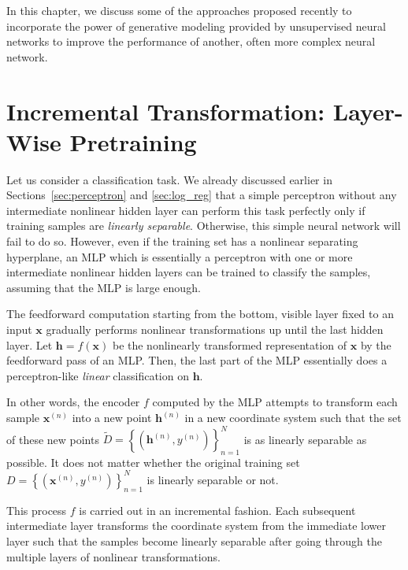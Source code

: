\documentclass[dissertation,nocontribution]{aaltoseries}
\newcommand{\vect}[1]{\mathbf{#1}}
\newcommand{\vh}[0]{\vect{h}}
\newcommand{\vx}[0]{\vect{x}}
\begin{document}
In this chapter, we discuss some of the approaches proposed
recently to incorporate the power of generative modeling
provided by unsupervised neural networks to improve the
performance of another, often more complex neural network.  


\section{Incremental Transformation: Layer-Wise Pretraining}
\label{sec:layer_wise_pretraining}

Let us consider a classification task. We already
discussed earlier in Sections~\ref{sec:perceptron} and
\ref{sec:log_reg} that a simple perceptron without any
intermediate nonlinear hidden layer can perform this task
perfectly only if training samples are \textit{linearly
separable}. Otherwise, this simple neural network will fail to
do so.  However, even
if the training set has a nonlinear separating hyperplane,
an MLP which is essentially a perceptron with one or more
intermediate nonlinear hidden layers can be trained to
classify the samples, assuming that the MLP is large enough.

The feedforward computation starting from the bottom,
visible layer fixed to an input $\vx$ gradually performs
nonlinear transformations up until the last hidden layer.
Let $\vh=f(\vx)$ be the nonlinearly transformed
representation of $\vx$ by the feedforward pass of an MLP.
Then, the last part of the MLP essentially does a
perceptron-like \textit{linear} classification on $\vh$.

In other words, the encoder $f$ computed by the MLP attempts to
transform each sample $\vx^{(n)}$ into a new point
$\vh^{(n)}$ in a new coordinate system such that the set of
these new points $\tilde{D} = \left\{ (\vh^{(n)}, y^{(n)})
\right\}_{n=1}^N$ is as linearly separable as possible. It
does not matter whether the original training set $D=\left\{
(\vx^{(n)},y^{(n)}) \right\}_{n=1}^N$ is linearly
separable or not.

This process $f$ is carried out in an incremental fashion.
Each subsequent intermediate layer transforms the coordinate
system from the immediate lower layer such that the samples
become linearly separable after going through the multiple
layers of nonlinear transformations.
%

\end{document}
